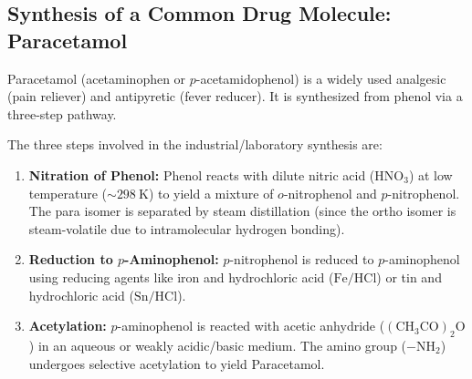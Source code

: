 \documentclass[12pt,a4paper]{article}
\begin{document}
\subsection{Synthesis of a Common Drug Molecule: Paracetamol}
Paracetamol (acetaminophen or $p$-acetamidophenol) is a widely used analgesic (pain reliever) and antipyretic (fever reducer). It is synthesized from phenol via a three-step pathway.

\begin{tcolorbox}[defbox, title={Paracetamol Synthesis Reactions}]
The three steps involved in the industrial/laboratory synthesis are:
\begin{enumerate}[leftmargin=*, itemsep=3pt, topsep=2pt]
  \item \textbf{Nitration of Phenol:} Phenol reacts with dilute nitric acid ($\mathrm{HNO_3}$) at low temperature ($\sim 298\ \mathrm{K}$) to yield a mixture of $o$-nitrophenol and $p$-nitrophenol. The para isomer is separated by steam distillation (since the ortho isomer is steam-volatile due to intramolecular hydrogen bonding).
  \item \textbf{Reduction to $p$-Aminophenol:} $p$-nitrophenol is reduced to $p$-aminophenol using reducing agents like iron and hydrochloric acid ($\mathrm{Fe/HCl}$) or tin and hydrochloric acid ($\mathrm{Sn/HCl}$).
  \item \textbf{Acetylation:} $p$-aminophenol is reacted with acetic anhydride ($\mathrm{(CH_3CO)_2O}$) in an aqueous or weakly acidic/basic medium. The amino group ($-\mathrm{NH_2}$) undergoes selective acetylation to yield Paracetamol.
\end{enumerate}
\end{tcolorbox}

\begin{tcolorbox}[tikzbox, title={Reaction Scheme: Phenol to Paracetamol}]
\centering
{}
\end{tcolorbox}
\end{document}
